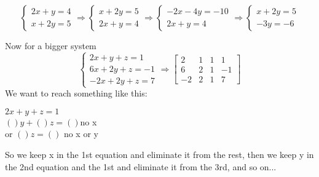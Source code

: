 \documentclass{article}
\begin{document}
 \begin{example}
    \[
         \begin{cases}
            2x+y=4\\ x+2y=5
          \end{cases} \Rightarrow
          \begin{cases}
            x+2y=5\\ 2x+y=4 
          \end{cases}\Rightarrow
          \begin{cases}
            -2x-4y=-10\\ 2x+y=4 
          \end{cases}\Rightarrow
          \begin{cases}
            x+2y=5\\ -3y=-6
          \end{cases}
    \]
 \end{example}            
 Now for a bigger system
 \[
   \begin{cases}
        2x+y+z=1\\ 6x+2y+z=-1 \\ -2x+2y+z=7
   \end{cases} \Rightarrow 
   \begin{bmatrix}
        2&1&1&1\\ 6&2&1&-1\\ -2&2&1&7
   \end{bmatrix}
 \]
We want to reach something like this:
\begin{center}
     $2x+y+z=1$\\ 
   $()y+()z=()$\textrightarrow no x\\
   or $()z=()$ \textrightarrow no x or y 
\end{center}
So we keep x in the 1st equation and eliminate it from the rest, then we keep y in the 2nd equation and the 1st and eliminate it from the 3rd, and so on... 
\end{document}
